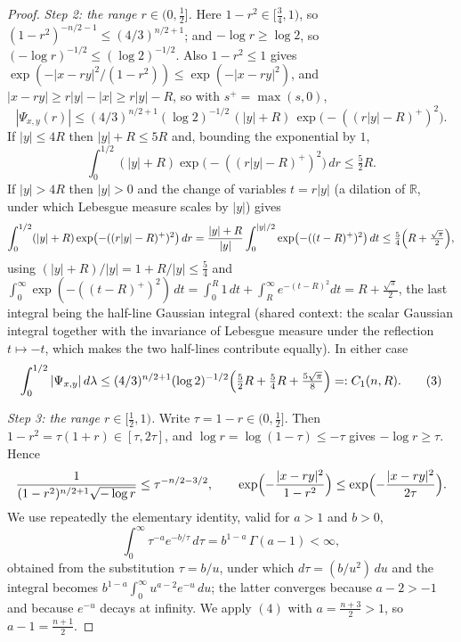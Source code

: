 \begin{proof}
\emph{Step 2: the range $r \in (0,\tfrac12]$.}
Here $1-r^2 \in [\tfrac34,1)$, so $(1-r^2)^{-n/2-1} \leq (4/3)^{n/2+1}$; and
$-\log r \geq \log 2$, so $(-\log r)^{-1/2} \leq (\log 2)^{-1/2}$.  Also
$1-r^2 \leq 1$ gives
$\exp(-|x-ry|^2/(1-r^2)) \leq \exp(-|x-ry|^2)$, and
$|x-ry| \geq r|y| - |x| \geq r|y| - R$, so with $s^+ = \max(s,0)$,
\[
  |\Psi_{x,y}(r)|
    \leq (4/3)^{n/2+1}(\log2)^{-1/2}\,(|y|+R)\,
         \exp\bigl(-((r|y|-R)^+)^2\bigr) .
\]
If $|y| \leq 4R$ then $|y| + R \leq 5R$ and, bounding the exponential by $1$,
\[
  \int_0^{1/2}(|y|+R)\exp\bigl(-((r|y|-R)^+)^2\bigr)\,dr \leq \tfrac52 R .
\]
If $|y| > 4R$ then $|y| > 0$ and the change of variables $t = r|y|$ (a dilation
of $\mathbb{R}$, under which Lebesgue measure scales by $|y|$) gives
\[
  \int_0^{1/2}(|y|+R)\exp\bigl(-((r|y|-R)^+)^2\bigr)\,dr
    = \frac{|y|+R}{|y|}\int_0^{|y|/2}\exp\bigl(-((t-R)^+)^2\bigr)\,dt
    \leq \tfrac54\Bigl(R + \tfrac{\sqrt\pi}{2}\Bigr) ,
\]
using $(|y|+R)/|y| = 1 + R/|y| \leq \tfrac54$ and
$\int_0^\infty\exp(-((t-R)^+)^2)\,dt
 = \int_0^R 1\,dt + \int_R^\infty e^{-(t-R)^2}dt = R + \tfrac{\sqrt\pi}{2}$,
the last integral being the half-line Gaussian integral (shared context: the
scalar Gaussian integral together with the invariance of Lebesgue measure under
the reflection $t \mapsto -t$, which makes the two half-lines contribute
equally).  In either case
\begin{equation*}
  \int_0^{1/2}|\Psi_{x,y}|\,d\lambda
    \leq (4/3)^{n/2+1}(\log2)^{-1/2}\Bigl(\tfrac52R + \tfrac54 R
      + \tfrac{5\sqrt\pi}{8}\Bigr) =: C_1(n,R) . \tag{3}
\end{equation*}

\emph{Step 3: the range $r \in [\tfrac12,1)$.}
Write $\tau = 1-r \in (0,\tfrac12]$.  Then $1-r^2 = \tau(1+r) \in [\tau,2\tau]$,
and $\log r = \log(1-\tau) \leq -\tau$ gives $-\log r \geq \tau$.  Hence
\[
  \frac{1}{(1-r^2)^{n/2+1}\sqrt{-\log r}} \leq \tau^{-n/2-3/2} ,
  \qquad
  \exp\Bigl(-\frac{|x-ry|^2}{1-r^2}\Bigr) \leq \exp\Bigl(-\frac{|x-ry|^2}{2\tau}\Bigr) .
\]
We use repeatedly the elementary identity, valid for $a > 1$ and $b > 0$,
\begin{equation*}
  \int_0^\infty \tau^{-a}e^{-b/\tau}\,d\tau = b^{1-a}\,\Gamma(a-1) < \infty ,
  \tag{4}
\end{equation*}
obtained from the substitution $\tau = b/u$, under which
$d\tau = (b/u^2)\,du$ and the integral becomes
$b^{1-a}\int_0^\infty u^{a-2}e^{-u}\,du$; the latter converges because
$a - 2 > -1$ and because $e^{-u}$ decays at infinity.  We apply $(4)$ with
$a = \tfrac{n+3}{2} > 1$, so $a - 1 = \tfrac{n+1}{2}$.


\end{proof}
